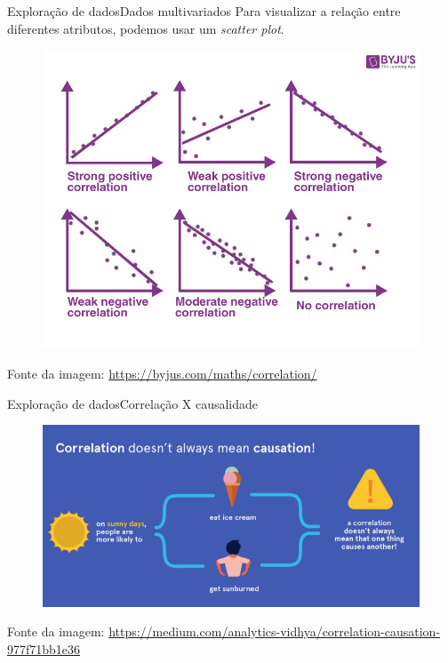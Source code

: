 \documentclass[t]{beamer}
\begin{document}
\begin{ftst}{Exploração de dados}{Dados multivariados}
Para visualizar a relação entre diferentes atributos, podemos usar um \textit{scatter plot}.
\begin{figure}
    \centering
    \includegraphics[trim=1cm 1cm 1cm 2cm, clip=true, scale=0.32]{Figuras/slide01_09.png}
\end{figure}
\scriptsize
Fonte da imagem: \href{https://byjus.com/maths/correlation/}{https://byjus.com/maths/correlation/}

\end{ftst}


\begin{ftst}{Exploração de dados}{Correlação X causalidade}

\begin{figure}
    \centering
    \includegraphics[scale=0.4]{Figuras/slide01_10.png}
\end{figure}
\vone
\vone
\scriptsize
Fonte da imagem: \href{https://medium.com/analytics-vidhya/correlation-causation-977f71bb1e36}{https://medium.com/analytics-vidhya/correlation-causation-977f71bb1e36}

\end{ftst}

\end{document}
